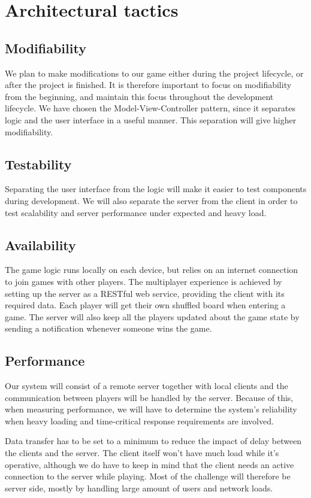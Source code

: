 \section{Architectural tactics}
\label{sec:architecturaltactics}

\subsection{Modifiability} 
We plan to make modifications to our game either during the project lifecycle,
or after the project is finished. It is therefore important to focus on
modifiability from the beginning, and maintain this focus throughout the
development lifecycle. We have chosen the Model-View-Controller pattern, since
it separates logic and the user interface in a useful manner. This separation
will give higher modifiability.

\subsection{Testability}
Separating the user interface from the logic will make it easier to test
components during development. We will also separate the server from the
client in order to test scalability and server performance under expected and
heavy load.

\subsection{Availability} 
The game logic runs locally on each device, but relies on an internet
connection to join games with other players. The multiplayer experience is
achieved by setting up the server as a RESTful web service, providing the
client with its required data. Each player will get their own shuffled board
when entering a game. The server will also keep all the players updated about
the game state by sending a notification whenever someone wins the game.

\subsection{Performance}
Our system will consist of a remote server together with local clients and the
communication between players will be handled by the server. Because of this,
when measuring performance, we will have to determine the system's reliability
when heavy loading and time-critical response requirements are involved.

Data transfer has to be set to a minimum to reduce the impact of delay between
the clients and the server. The client itself won't have much load while it's
operative, although we do have to keep in mind that the client needs an
active connection to the server while playing. Most of the challenge will
therefore be server side, mostly by handling large amount of users and network
loads.

